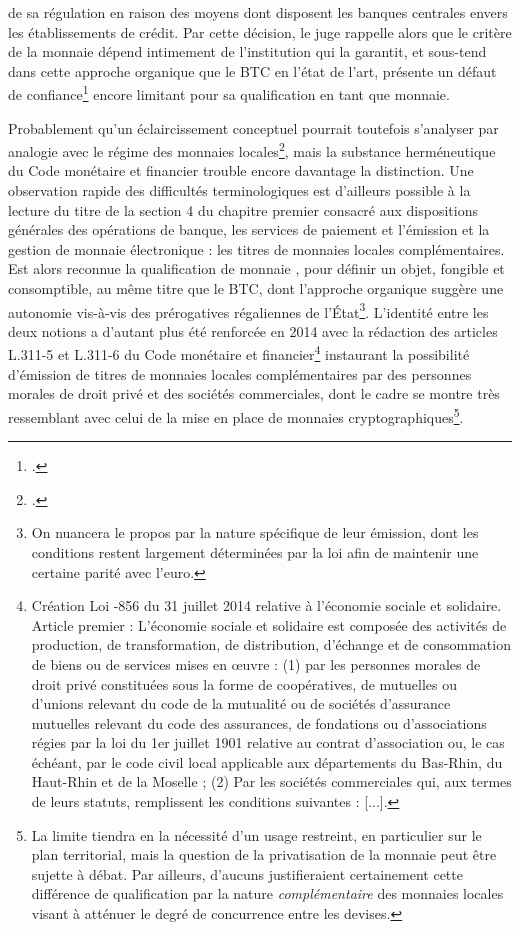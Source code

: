 {de sa régulation en raison des moyens dont disposent les banques centrales envers les établissements de crédit. Par cette décision, le juge rappelle alors que le critère de la monnaie dépend intimement de l'institution qui la garantit, et sous-tend dans cette approche organique que le BTC en l'état de l'art, présente un défaut de confiance\footnote{.} encore limitant pour sa qualification en tant que monnaie.\par

Probablement qu'un éclaircissement conceptuel pourrait toutefois s'analyser par analogie avec le régime des monnaies locales\footnote{.}, mais la substance herméneutique du Code monétaire et financier trouble encore davantage la distinction. Une observation rapide des difficultés terminologiques est d'ailleurs possible à la lecture du titre de la section 4 du chapitre premier consacré aux dispositions générales des opérations de banque, les services de paiement et l'émission et la gestion de monnaie électronique : les titres de monnaies locales complémentaires. Est alors reconnue la qualification de \og monnaie \fg{}, pour définir un objet, fongible et consomptible, au même titre que le BTC, dont l'approche organique suggère une autonomie vis-à-vis des prérogatives régaliennes de l'État\footnote{On nuancera le propos par la nature spécifique de leur émission, dont les conditions restent largement déterminées par la loi afin de maintenir une certaine parité avec l'euro.}. L'identité entre les deux notions a d'autant plus été renforcée en 2014 avec la rédaction des articles L.311-5 et L.311-6 du Code monétaire et financier\footnote{Création Loi -856 du 31 juillet 2014 relative à l'économie sociale et solidaire. Article premier : \og L'économie sociale et solidaire est composée des activités de production, de transformation, de distribution, d'échange et de consommation de biens ou de services mises en \oe{}uvre : (1) par les personnes morales de droit privé constituées sous la forme de coopératives, de mutuelles ou d'unions relevant du code de la mutualité ou de sociétés d'assurance mutuelles relevant du code des assurances, de fondations ou d'associations régies par la loi du 1er juillet 1901 relative au contrat d'association ou, le cas échéant, par le code civil local applicable aux départements du Bas-Rhin, du Haut-Rhin et de la Moselle ; (2) Par les sociétés commerciales qui, aux termes de leurs statuts, remplissent les conditions suivantes : [...].} instaurant la possibilité d'émission de titres de monnaies locales complémentaires par des personnes morales de droit privé et des sociétés commerciales, dont le cadre se montre très ressemblant avec celui de la mise en place de monnaies cryptographiques\footnote{La limite tiendra en la nécessité d'un usage restreint, en particulier sur le plan territorial, mais la question de la privatisation de la monnaie peut être sujette à débat. Par ailleurs, d'aucuns justifieraient certainement cette différence de qualification par la nature \emph{complémentaire} des monnaies locales visant à atténuer le degré de concurrence entre les devises.}.\par

}
